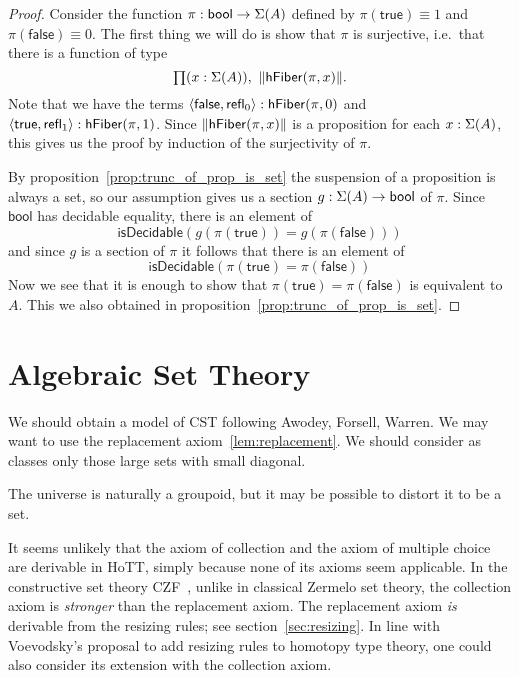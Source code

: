 \begin{proof}
Consider the function $\pi:\mathsf{bool}\to\Sigma(A)$ defined by 
$\pi(\mathsf{true})\equiv 1$ and $\pi(\mathsf{false})\equiv 0$. 
The first thing we will do is show that $\pi$ is surjective, 
i.e.\ that there is a function of type
\begin{equation*}
\prd{x:\susp(A)} \|\hfiber\pi{x}\|.
\end{equation*}
Note that we have the terms 
$\langle{\mathsf{false},\ensuremath{\mathsf{refl}_{0}}}\rangle:\mathsf{hFiber}(\pi,0)$ 
and $\langle{\mathsf{true},\ensuremath{\mathsf{refl}_{1}}}\rangle:\mathsf{hFiber}(\pi,1)$. 
Since $\|\mathsf{hFiber}(\pi,x)\|$ is a proposition for each 
$x:\Sigma(A)$, this gives us the proof by induction of 
the surjectivity of $\pi$.

By proposition~\ref{prop:trunc_of_prop_is_set} the suspension of 
a proposition is always a set, so our assumption gives us a 
section $g:\Sigma(A)\to\mathsf{bool}$ of $\pi$. 
Since $\mathsf{bool}$ has decidable equality, there is an element of
\begin{equation*}
\mathsf{isDecidable}(g(\pi(\mathsf{true}))= g(\pi(\mathsf{false})))
\end{equation*}
and since $g$ is a section of $\pi$ it follows that there is an element of
\begin{equation*}
\mathsf{isDecidable}(\pi(\mathsf{true})=\pi(\mathsf{false}))
\end{equation*}
Now we see that it is enough to show that 
$\pi(\mathsf{true})= \pi(\mathsf{false})$ is equivalent to $A$. 
This we also obtained in proposition~\ref{prop:trunc_of_prop_is_set}.
\end{proof}

\section{Algebraic Set Theory}
We should obtain a model of CST following Awodey, Forsell, Warren. 
We may want to use the replacement axiom~\ref{lem:replacement}.
We should consider as classes only those large sets with small diagonal.

The universe is naturally a groupoid, but it may be possible to distort it to be a set.

It seems unlikely that the axiom of collection and the axiom of multiple choice are derivable in HoTT,
simply because none of its axioms seem applicable.  In the constructive set theory CZF~\cite{aczel2001notes}, unlike in classical Zermelo
set theory, the collection axiom is \emph{stronger} than the replacement axiom. 
The replacement axiom \emph{is} derivable from the resizing rules; see section~\ref{sec:resizing}.
In line with Voevodsky's proposal to add resizing rules to homotopy type theory, one could also consider its extension with the
collection axiom.

